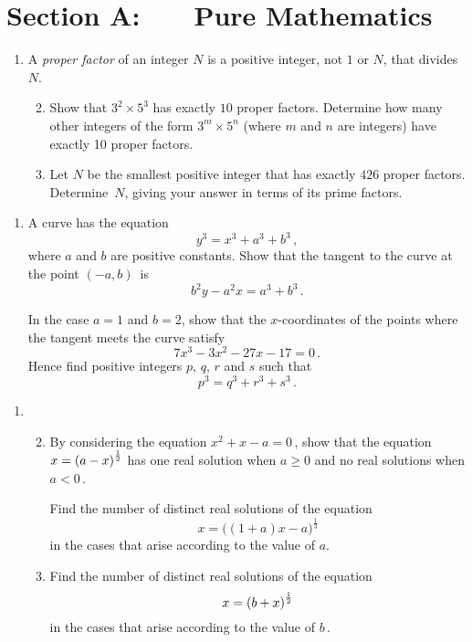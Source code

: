 \documentclass[a4, 11pt]{report}
\newlength{\qspace}
\newcounter{qnumber}
\newenvironment{question}%
 {\vspace{\qspace}
  \begin{enumerate}[\bfseries 1\quad][10]%
    \setcounter{enumi}{\value{qnumber}}%
    \item%
 }
{
  \end{enumerate}
  \filbreak
  \stepcounter{qnumber}
 }
\newenvironment{questionparts}[1][1]%
 {
  \begin{enumerate}[\bfseries (i)]%
    \setcounter{enumii}{#1}
    \addtocounter{enumii}{-1}
    \setlength{\itemsep}{5mm}
    \setlength{\parskip}{8pt}
 }
 {
  \end{enumerate}
 }
\def\ge{\geqslant}
\begin{document}
\setcounter{page}{2}

 
\section*{Section A: \ \ \ Pure Mathematics}

\begin{question}
A {\em proper factor} of an integer  $N$ is a positive integer,
not $1$ or $N$, that divides $N$.

\begin{questionparts}
\item Show that $3^2\times 5^3$ has exactly $10$ proper factors. Determine
how  many other integers of the form $3^m\times5^n$ (where $m$ and $n$
are integers) have exactly 10 proper factors.


\item Let $N$ be the smallest positive 
integer that has exactly $426$ proper
factors. Determine~$N$, giving your answer in terms of its prime factors.
\end{questionparts}
\end{question}

\begin{question}
A curve has the equation                           
\[
y^3 = x^3 +a^3+b^3\,,
\]
where $a$ and $b$ are positive constants. Show that the tangent
to the curve 
at the point $(-a,b)$~is 
\[
b^2y-a^2x = a^3+b^3\,.
\]

In the case $a=1$ and $b=2$, show that the $x$-coordinates of the 
points where the tangent meets the curve satisfy
\[
7x^3 -3x^2 -27x-17 =0\,.
\]
Hence find  positive integers $p$, $q$, $r$ and $s$ such that
\[
p^3 = q^3 +r^3 +s^3\,.
\]
\end{question}

\begin{question}
\begin{questionparts}
\item
 By considering the equation $x^2+x-a=0\,$, 
show that the equation
$x={(a-x)\vphantom M}^{\frac12}$ has one real solution when $a\ge0$ and no
real solutions when $a<0\,$.

Find the number of distinct real solutions of the equation
\[
x={\big((1+a)x-a\big)}^{\!\frac13}
\]
in the cases that arise according to the value of $a$.
\item Find the number of distinct real solutions of the equation
\[
x={(b+x)\vphantom M}^{\frac12}
\]
in the cases that arise according to the value of $b\,$.
\end{questionparts}
\end{question}
\end{document}
